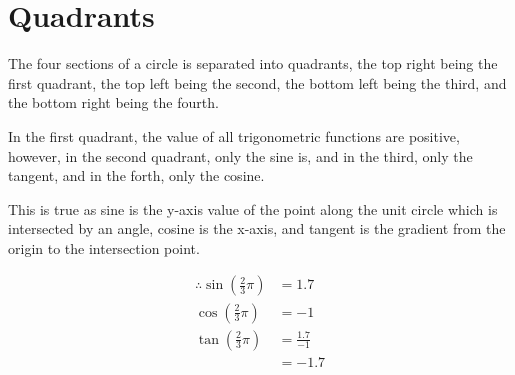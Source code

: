 \documentclass{book}
\begin{document}
\section{Quadrants}
The four sections of a circle is separated into quadrants, the top right being the first quadrant, the top left being the second, the bottom left being the third, and the bottom right being the fourth.

\begin{center}
\end{center}

In the first quadrant, the value of all trigonometric functions are positive, however, in the second quadrant, only the sine is, and in the third, only the tangent, and in the forth, only the cosine.

\begin{center}
\end{center}

This is true as sine is the y-axis value of the point along the unit circle which is intersected by an angle, cosine is the x-axis, and tangent is the gradient from the origin to the intersection point.

\begin{center}
	\begin{align*}
		\therefore \sin\left(\frac{2}{3}\pi\right) & = 1.7            \\
		\cos\left(\frac{2}{3}\pi\right)            & = -1             \\
		\tan\left(\frac{2}{3}\pi\right)            & = \frac{1.7}{-1} \\
		                                           & = -1.7
	\end{align*}
\end{center}
\end{document}
